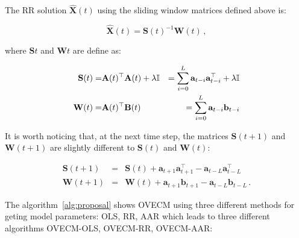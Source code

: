 The RR solution $\mathbf{\hat{X}}(t)$ using the sliding window matrices defined above
is:

\begin{equation}
\label{eq:oproblem}
\mathbf{\hat{X}}(t)=\mathbf{S}(t)^{-1} \mathbf{W}(t) \, ,
\end{equation}

\noindent where $\mathbf{S}{t}$ and $\mathbf{W}{t}$ are define as:

\begin{eqnarray*}
\mathbf{S}(t) =&{\bf A}(t)^\top{\bf A}(t)+ \lambda \mathbb{I} &=
\sum_{i=0}^L \mathbf{a}_{t-i}\mathbf{a}_{t-i}^\top + \lambda \mathbb{I}
\label{eq:S} \\
\mathbf{W}(t) =& {\bf A}(t)^\top{\bf B}(t) &= 
\sum_{i=0}^L \mathbf{a}_{t-i}\mathbf{b}_{t-i} 
\label{eq:W}
\end{eqnarray*}

It is worth noticing that, at the next time step, the matrices $\mathbf{S}(t+1)$
and $\mathbf{W}(t+1)$ are slightly different to $\mathbf{S}(t)$ and
$\mathbf{W}(t)$:

\begin{eqnarray*}
\mathbf{S}(t+1)&=&
\mathbf{S}(t) +
\mathbf{a}_{t+1}
\mathbf{a}_{t+1}^\top -
\mathbf{a}_{t-L} \mathbf{a}_{t-L}^\top \\
\mathbf{W}(t+1)&=&
\mathbf{W}(t) +
\mathbf{a}_{t+1}
\mathbf{b}_{t+1} -
\mathbf{a}_{t-L} \mathbf{b}_{t-L} \, .
\end{eqnarray*}


The algorithm~\ref{alg:proposal} shows OVECM using three different
methods for geting model parameters: OLS, RR, AAR which leads to three different
algorithms OVECM-OLS, OVECM-RR, OVECM-AAR:

